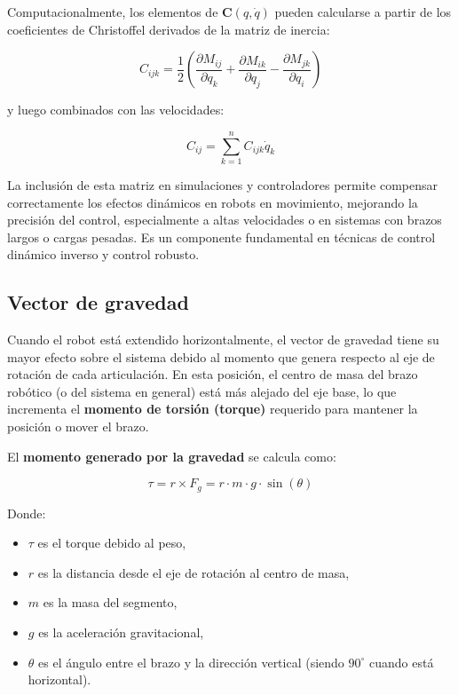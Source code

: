 Computacionalmente, los elementos de $\mathbf{C}(q, \dot{q})$ pueden calcularse a partir de los coeficientes de Christoffel derivados de la matriz de inercia:

\[
C_{ijk} = \frac{1}{2} \left( \frac{\partial M_{ij}}{\partial q_k} + \frac{\partial M_{ik}}{\partial q_j} - \frac{\partial M_{jk}}{\partial q_i} \right)
\]

y luego combinados con las velocidades:

\[
C_{ij} = \sum_{k=1}^{n} C_{ijk} \dot{q}_k
\]

La inclusión de esta matriz en simulaciones y controladores permite compensar correctamente los efectos dinámicos en robots en movimiento, mejorando la precisión del control, especialmente a altas velocidades o en sistemas con brazos largos o cargas pesadas. Es un componente fundamental en técnicas de control dinámico inverso y control robusto.



\subsection{Vector de gravedad}

Cuando el robot está extendido horizontalmente, el vector de gravedad tiene su mayor efecto sobre el sistema debido al momento que genera respecto al eje de rotación de cada articulación. En esta posición, el centro de masa del brazo robótico (o del sistema en general) está más alejado del eje base, lo que incrementa el \textbf{momento de torsión (torque)} requerido para mantener la posición o mover el brazo.

El \textbf{momento generado por la gravedad} se calcula como:

\begin{equation}
	\tau = r \times F_g = r \cdot m \cdot g \cdot \sin(\theta)
\end{equation}

Donde:
\begin{itemize}
	\item $\tau$ es el torque debido al peso,
	\item $r$ es la distancia desde el eje de rotación al centro de masa,
	\item $m$ es la masa del segmento,
	\item $g$ es la aceleración gravitacional,
	\item $\theta$ es el ángulo entre el brazo y la dirección vertical (siendo $90^\circ$ cuando está horizontal).
\end{itemize}

